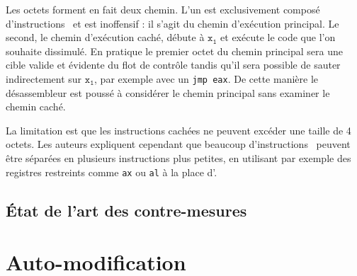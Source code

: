 Les octets forment en fait deux chemin. L'un est exclusivement composé d'instructions \nop\ et est inoffensif : il s'agit du chemin d'exécution principal. Le second, le chemin d'exécution caché, débute à $\mathtt{x_1}$ et exécute le code que l'on souhaite dissimulé. En pratique le premier octet du chemin principal sera une cible valide et évidente du flot de contrôle tandis qu'il sera possible de sauter indirectement sur $\mathtt{x_1}$, par exemple avec un \texttt{jmp eax}. De cette manière le désassembleur est poussé à considérer le chemin principal sans examiner le chemin caché.

La limitation est que les instructions cachées ne peuvent excéder une taille de 4 octets. Les auteurs expliquent cependant que beaucoup d'instructions \xq\ peuvent être séparées en plusieurs instructions plus petites, en utilisant par exemple des registres restreints comme \texttt{ax} ou \texttt{al} à la place d'\eax.


\subsection{État de l'art des contre-mesures}
\section{Auto-modification}


